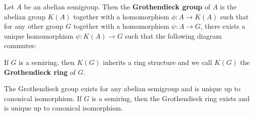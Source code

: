   \begin{definition}\label{def:kTheo-grothendiekGroupAndRing}
	Let $A$ be an abelian semigroup. Then the \textbf{Grothendieck group} of $A$ is the abelian group $K(A)$ together with a homomorphism $\phi:A\to K(A)$ such that for any other group $G$ together with a homomorphism $\psi:A\to G$, there exists a unique homomorphism $\psi:K(A)\to G$ such that the following diagram commutes:	
	\begin{center}
	\end{center} If $G$ is a semiring, then $K(G)$ inherits a ring structure and we call $K(G)$ the \textbf{Grothendieck ring} of $G$.
  \end{definition}
  \begin{corollary}\label{cor:kTheo-ConstructionOfGrothendiekGroup} 
	The Grothendieck group exists for any abelian semigroup and is unique up to canonical isomorphism. If $G$ is a semiring, then the Grothendieck ring exists and is unique up to canonical isomorphism.
  \end{corollary}
